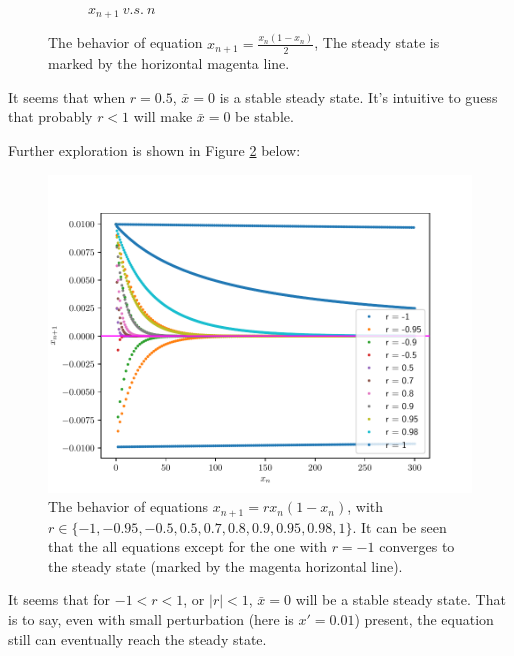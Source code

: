 \begin{homeworkProblem}[2]
\begin{enumerate}
\begin{figure}[h]
\begin{subfigure}[t]{0.4\linewidth}
        \caption{$x_{n+1}\ v.s.\ n$}
    \end{subfigure}
    \centering
    \caption[The behavior of equation $x_{n+1} = \frac{x_n(1-x_n)}{2}$]{
    The behavior of equation $x_{n+1} = \frac{x_n(1-x_n)}{2}$,
    The steady state is marked by the horizontal magenta line.}
    \label{fig:fig2a2}
\end{figure}
It seems that when $r = 0.5$, $\bar x = 0$ is a stable steady state. It's
intuitive to guess that probably $r < 1$ will make $\bar x = 0$ be stable.

Further exploration is shown in Figure \ref{fig:fig2a3} below:
\begin{figure}
    \centering
    \caption[The behavior of equations $x_{n+1} = rx_n(1-x_n)$]{
    The behavior of equations $x_{n+1} = rx_n(1-x_n)$, with $r \in \{
        -1, -0.95, -0.5, 0.5, 0.7,0.8, 0.9, 0.95, 0.98, 1
    \}$. It can be seen that the all equations except for the one with $r = -1$
    converges to the steady state (marked by the magenta horizontal line).}
    \label{fig:fig2a3}
    \includegraphics[scale=0.6]{../fig/fig2(a)(3).pdf}
\end{figure}

It seems that for $-1 < r < 1$, or $|r| < 1$, $\bar x = 0$ will be a stable
steady state. That is to say, even with small perturbation (here is $x' = 0.01$)
present, the equation still can eventually reach the steady state.

\segline


\end{enumerate}
\end{homeworkProblem}
